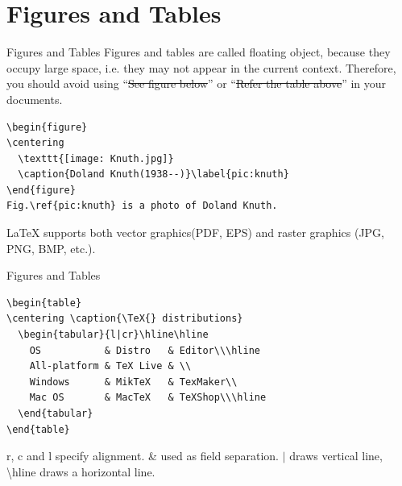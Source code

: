 \documentclass[10pt,t]{beamer}
\begin{document}
\section{Figures and Tables}
\begin{frame}[fragile]{Figures and Tables}
    Figures and tables are called \alert{floating object}, because
    they occupy large space, i.e. they may not appear in the current
    context. Therefore, you should avoid using ``\sout{See figure below}''
    or ``\sout{Refer the table above}'' in your documents.

\begin{lstlisting}[language={[LaTeX]TeX},keywordstyle=\color{red}]
\begin{figure}
\centering
  \texttt{[image: Knuth.jpg]}
  \caption{Doland Knuth(1938--)}\label{pic:knuth}
\end{figure}
Fig.\ref{pic:knuth} is a photo of Doland Knuth.
\end{lstlisting}

    \LaTeX{} supports both vector graphics(PDF, EPS) and raster graphics
    (JPG, PNG, BMP, etc.).

\end{frame}

\begin{frame}[fragile]{Figures and Tables}

\begin{lstlisting}[language={[LaTeX]TeX},keywordstyle=\color{red}]
\begin{table}
\centering \caption{\TeX{} distributions}
  \begin{tabular}{l|cr}\hline\hline
    OS           & Distro   & Editor\\\hline
    All-platform & TeX Live & \\
    Windows      & MikTeX   & TexMaker\\
    Mac OS       & MacTeX   & TeXShop\\\hline
  \end{tabular}
\end{table}
\end{lstlisting}

    \alert{r}, \alert{c} and \alert{l} specify alignment.
    \alert{\&} used as field separation. \alert{$|$} draws vertical
    line, \alert{\textbackslash hline} draws a horizontal line.
\end{frame}
\end{document}
